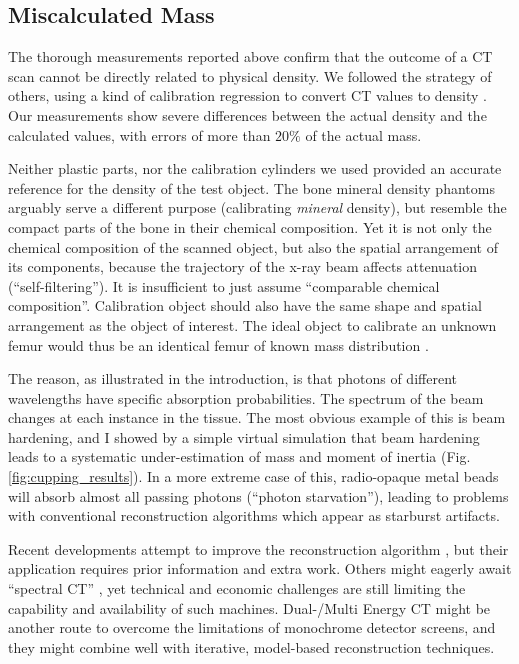 \subsection{Miscalculated Mass}
\label{sec:org14a5edb}
The thorough measurements reported above confirm that the outcome of a CT scan cannot be directly related to physical density.
We followed the strategy of others, using a kind of calibration regression to convert CT values to density \citep{Mull1984,Phillips1997,DuPlessis2013,Durston2022,Fath2023}.
Our measurements show severe differences between the actual density and the calculated values, with errors of more than \(20\%\) of the actual mass.


Neither plastic parts, nor the calibration cylinders we used provided an accurate reference for the density of the test object.
The bone mineral density phantoms arguably serve a different purpose (calibrating \emph{mineral} density), but resemble the compact parts of the bone in their chemical composition.
Yet it is not only the chemical composition of the scanned object, but also the spatial arrangement of its components, because the trajectory of the x-ray beam affects attenuation (``self-filtering'').
It is insufficient to just assume ``comparable chemical composition''.
Calibration object should also have the same shape and spatial arrangement as the object of interest.
The ideal object to calibrate an unknown femur would thus be an identical femur of known mass distribution \citep[which is actually attempted in clinical tomography, cf.][]{Lennie2021}.


The reason, as illustrated in the introduction, is that photons of different wavelengths have specific absorption probabilities.
The spectrum of the beam changes at each instance in the tissue.
The most obvious example of this is beam hardening, and I showed by a simple virtual simulation that beam hardening leads to a systematic under-estimation of mass and moment of inertia (Fig. \ref{fig:cupping_results}).
In a more extreme case of this, radio-opaque metal beads will absorb almost all passing photons (``photon starvation''), leading to problems with conventional reconstruction algorithms which appear as starburst artifacts.


Recent developments attempt to improve the reconstruction algorithm \citep{Six2019,Frenkel2022,Yang2021,Batenburg2011}, but their application requires prior information and extra work.
Others might eagerly await ``spectral CT'' \citep{Liu2023}, yet technical and economic challenges are still limiting the capability and availability of such machines.
Dual-/Multi Energy CT might be another route to overcome the limitations of monochrome detector screens, and they might combine well with iterative, model-based reconstruction techniques.


